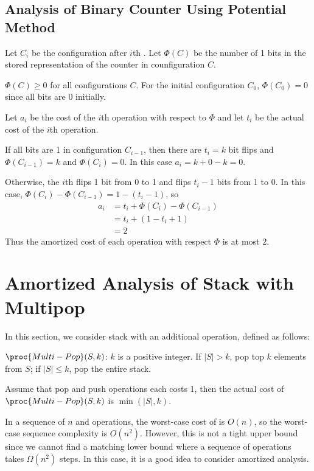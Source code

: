 \subsection{Analysis of Binary Counter Using Potential Method}

Let $C_i$ be the configuration after $i$th . Let $\Phi(C)$ be the number of 1 bits in the stored representation of the counter in counfiguration $C$.

$\Phi(C) \geq 0$ for all configurations $C$. For the initial configuration $C_0$, $\Phi(C_0) = 0$ since all bits are 0 initially.

Let $a_i$ be the cost of the $i$th  operation with respect to $\Phi$ and let $t_i$ be the actual cost of the $i$th  operation.

If all bits are 1 in configuration $C_{i-1}$, then there are $t_i = k$ bit flips and $\Phi(C_{i-1}) = k$ and $\Phi(C_i) = 0$. In this case $a_i = k+0-k = 0$.

Otherwise, the $i$th  flips 1 bit from 0 to 1 and flips $t_i-1$ bits from 1 to 0. In this case, $\Phi(C_i)-\Phi(C_{i-1}) = 1 - (t_i - 1)$, so
$$
\begin{aligned}
    a_i &= t_i + \Phi(C_i) - \Phi(C_{i-1}) \\
    &= t_i + (1-t_i + 1) \\
    &= 2
\end{aligned}
$$  
Thus the amortized cost of each  operation with respect $\Phi$ is at most 2.

\section{Amortized Analysis of Stack with Multipop}

In this section, we consider stack with an additional  operation, defined as follows:

$\proc{Multi-Pop}(S,k)$: $k$ is a positive integer. If $|S|>k$, pop top $k$ elements from $S$; if $|S|\leq k$, pop the entire stack.

Assume that pop and push operations each costs 1, then the actual cost of $\proc{Multi-Pop}(S,k)$ is $\min(|S|,k)$.

In a sequence of $n$  and  operations, the worst-case cost of  is $O(n)$, so the worst-case sequence complexity is $O(n^2)$. However, this is not a tight upper bound since we cannot find a matching lower bound where a sequence of operations takes $\Omega(n^2)$ steps. In this case, it is a good idea to consider amortized analysis.

